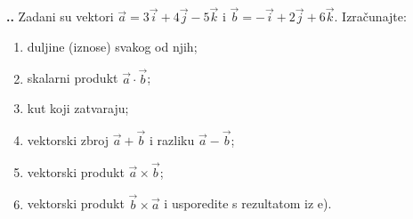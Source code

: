 
\noindent 
\textbf{
\thecjelina.\thezadatak.}
Zadani su vektori $\vec{a}=3\vec{i}+4\vec{j}-5\vec{k}$ i $\vec{b} = -\vec{i}+2\vec{j}+6\vec{k}$. Izračunajte:
\begin{enumerate}[label=\alph*)]
 \item duljine (iznose) svakog od njih;
 \item skalarni produkt $\vec{a}\cdot\vec{b}$;
 \item kut koji zatvaraju;
 \item vektorski zbroj $\vec{a} + \vec{b}$ i razliku  $\vec{a} - \vec{b} $;
 \item vektorski produkt $\vec{a} \times \vec{b} $;
 \item vektorski produkt $\vec{b} \times \vec{a} $ i usporedite s rezultatom iz e).
\end{enumerate}
